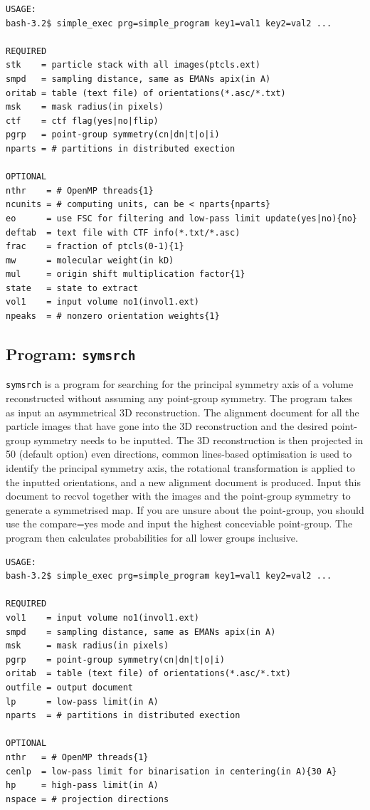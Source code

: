 \documentclass[a4paper,11pt]{article}
\newcommand{\prgname}[1]{\textcolor{NavyBlue}{\texttt{#1}}}
\begin{document}
\begin{verbatim}
USAGE:
bash-3.2$ simple_exec prg=simple_program key1=val1 key2=val2 ...

REQUIRED
stk    = particle stack with all images(ptcls.ext)
smpd   = sampling distance, same as EMANs apix(in A)
oritab = table (text file) of orientations(*.asc/*.txt)
msk    = mask radius(in pixels)
ctf    = ctf flag(yes|no|flip)
pgrp   = point-group symmetry(cn|dn|t|o|i)
nparts = # partitions in distributed exection

OPTIONAL
nthr    = # OpenMP threads{1}
ncunits = # computing units, can be < nparts{nparts}
eo      = use FSC for filtering and low-pass limit update(yes|no){no}
deftab  = text file with CTF info(*.txt/*.asc)
frac    = fraction of ptcls(0-1){1}
mw      = molecular weight(in kD)
mul     = origin shift multiplication factor{1}
state   = state to extract
vol1    = input volume no1(invol1.ext)
npeaks  = # nonzero orientation weights{1}
\end{verbatim}

\subsection{Program: \prgname{symsrch}}
\label{symsrch}
\prgname{symsrch} is a program for searching for the principal symmetry axis of a volume reconstructed without assuming any point-group symmetry. The program takes as input an asymmetrical 3D reconstruction. The alignment document for all the particle images that have gone into the 3D reconstruction and the desired point-group symmetry needs to be inputted. The 3D reconstruction is then projected in 50 (default option) even directions, common lines-based optimisation is used to identify the principal symmetry axis, the rotational transformation is applied to the inputted orientations, and a new alignment document is produced. Input this document to recvol together with the images and the point-group symmetry to generate a symmetrised map. If you are unsure about the point-group, you should use the compare=yes mode and input the highest conceviable point-group. The program then calculates probabilities for all lower groups inclusive.

\begin{verbatim}
USAGE:
bash-3.2$ simple_exec prg=simple_program key1=val1 key2=val2 ...

REQUIRED
vol1    = input volume no1(invol1.ext)
smpd    = sampling distance, same as EMANs apix(in A)
msk     = mask radius(in pixels)
pgrp    = point-group symmetry(cn|dn|t|o|i)
oritab  = table (text file) of orientations(*.asc/*.txt)
outfile = output document
lp      = low-pass limit(in A)
nparts  = # partitions in distributed exection

OPTIONAL
nthr   = # OpenMP threads{1}
cenlp  = low-pass limit for binarisation in centering(in A){30 A}
hp     = high-pass limit(in A)
nspace = # projection directions
\end{verbatim}
\end{document}
